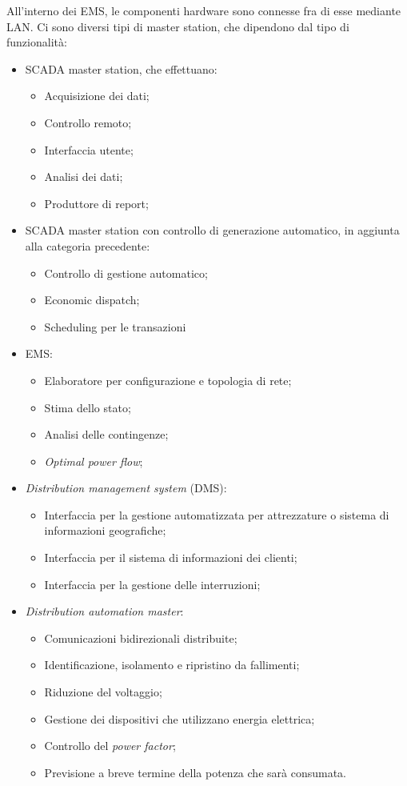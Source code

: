 All'interno dei EMS, le componenti hardware sono connesse fra di esse mediante LAN. Ci sono diversi tipi di master station, che dipendono dal tipo di funzionalità:
\begin{itemize}
	\item SCADA master station, che effettuano:
	\begin{itemize}
		\item Acquisizione dei dati;
		\item Controllo remoto;
		\item Interfaccia utente;
		\item Analisi dei dati;
		\item Produttore di report;
	\end{itemize}
	\item SCADA master station con controllo di generazione automatico, in aggiunta alla categoria precedente:
	\begin{itemize}
		\item Controllo di gestione automatico;
		\item Economic dispatch;
		\item Scheduling per le transazioni
	\end{itemize}
	\item EMS:
	\begin{itemize}
		\item Elaboratore per configurazione e topologia di rete;
		\item Stima dello stato;
		\item Analisi delle contingenze;
		\item \emph{Optimal power flow};
	\end{itemize}
	\item \emph{Distribution management system} (DMS):
	\begin{itemize}
		\item Interfaccia per la gestione automatizzata per attrezzature o sistema di informazioni geografiche;
		\item Interfaccia per il sistema di informazioni dei clienti;
		\item Interfaccia per la gestione delle interruzioni;
	\end{itemize}	 
	\item \emph{Distribution automation master}:
	\begin{itemize}
		\item Comunicazioni bidirezionali distribuite;
		\item Identificazione, isolamento e ripristino da fallimenti;
		\item Riduzione del voltaggio;
		\item Gestione dei dispositivi che utilizzano energia elettrica;
		\item Controllo del \emph{power factor};
		\item Previsione a breve termine della potenza che sarà consumata.
	\end{itemize}
\end{itemize} 

